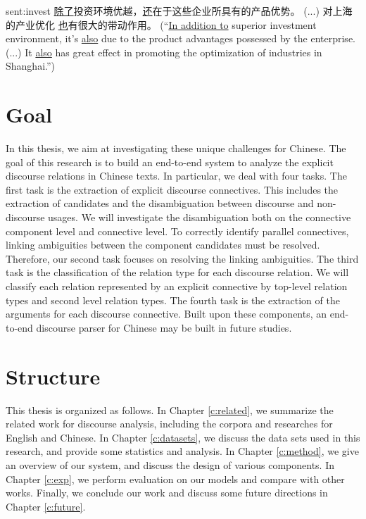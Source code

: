 \begin{sent}{sent:invest}{}
\underline{除了}投资环境优越，\underline{还}在于这些企业所具有的产品优势。
(...) 对上海的产业优化 \underline{也}有很大的带动作用。
(``\underline{In addition to}
superior investment environment, it's \underline{also} due to the product
advantages possessed by the enterprise. (...) It \underline{also} has
great effect in promoting the optimization of industries in Shanghai.'')
\end{sent}



%
%
\section{Goal}

In this thesis, we aim at investigating these unique challenges for Chinese.
The goal of this research is to build an end-to-end system to analyze
the explicit discourse relations in Chinese texts. In particular, we
deal with four tasks. The first task is the extraction of explicit discourse
connectives. This includes the extraction of candidates and the disambiguation
between discourse and non-discourse usages. We will investigate the disambiguation
both on the connective component level and connective level.
To correctly identify parallel connectives, linking ambiguities between
the component candidates must be resolved. Therefore, our second task
focuses on resolving the linking ambiguities.
The third task is the classification of the relation type for each discourse
relation.
We will classify each relation represented by an explicit connective by top-level
relation types and second level relation types.
The fourth task is the extraction of the arguments for each discourse connective.
Built upon these components, an end-to-end discourse parser for Chinese may
be built in future studies.

%
%
\section{Structure}
This thesis is organized as follows. In Chapter \ref{c:related}, we summarize
the related work for discourse analysis, including the corpora and researches for
English and Chinese. In Chapter \ref{c:datasets}, we discuss the data sets used in
this research, and provide some statistics and analysis. In Chapter \ref{c:method},
we give an overview of our system, and discuss the design of various components.
In Chapter \ref{c:exp}, we perform evaluation on our models and compare with
other works. Finally, we conclude our work and discuss some future directions in
Chapter \ref{c:future}.
